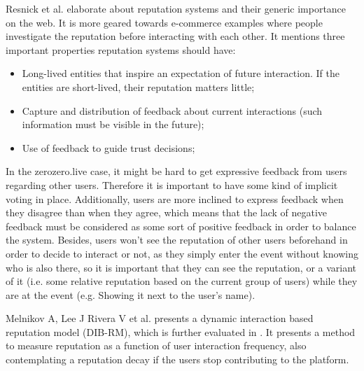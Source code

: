 Resnick et al. \cite{Resnick2000} elaborate about reputation systems and their generic importance on the web. It is more geared towards e-commerce examples where people investigate the reputation before interacting with each other. It mentions three important properties reputation systems should have:
\begin{itemize}
    \item Long-lived entities that inspire an expectation of future interaction. If the entities are short-lived, their reputation matters little;
    \item Capture and distribution of feedback about current interactions (such information must be visible in the future);
    \item Use of feedback to guide trust decisions;
\end{itemize}
In the zerozero.live case, it might be hard to get expressive feedback from users regarding other users. Therefore it is important to have some kind of implicit voting in place. Additionally, users are more inclined to express feedback when they disagree than when they agree, which means that the lack of negative feedback must be considered as some sort of positive feedback in order to balance the system. Besides, users won't see the reputation of other users beforehand in order to decide to interact or not, as they simply enter the event without knowing who is also there, so it is important that they can see the reputation, or a variant of it (i.e. some relative reputation based on the current group of users) while they are at the event (e.g. Showing it next to the user's name).

Melnikov A, Lee J Rivera V et al. \cite{Melnikov2018} presents a dynamic interaction based reputation model (DIB-RM), which is further evaluated in \cite{Yashkina2020}. It presents a method to measure reputation as a function of user interaction frequency, also contemplating a reputation decay if the users stop contributing to the platform. 

